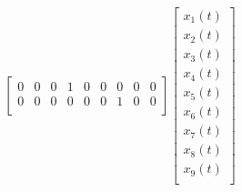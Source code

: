 \documentclass[12pt,a4paper]{article}
\begin{document}
\[\begin{aligned}
\begin{bmatrix}
                            0 & 0 & 0 & 1 & 0 & 0 & 0 & 0 & 0 \\
                            0 & 0 & 0 & 0 & 0 & 0 & 1 & 0 & 0 \\
                        \end{bmatrix} \begin{bmatrix}
                                        x_1(t) \\
                                        x_2(t) \\
                                        x_3(t) \\
                                        x_4(t) \\
                                        x_5(t) \\
                                        x_6(t) \\
                                        x_7(t) \\
                                        x_8(t) \\
                                        x_9(t) \\
                                    \end{bmatrix}
    \end{aligned}
\]
\end{document}
